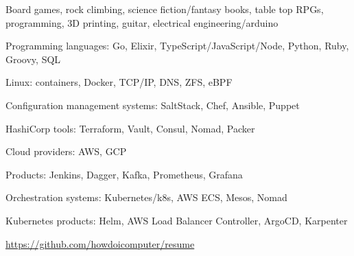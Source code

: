 \begin{cventries}
  \cventry
    {}
    {}
    {}
    {}
    {
      \begin{cvitems}
        \item {Board games, rock climbing, science fiction/fantasy books, table top RPGs, programming, 3D printing, guitar, electrical engineering/arduino}
      \end{cvitems}
    }
\end{cventries}

\begin{cventries}
  \cventry
    {}
    {}
    {}
    {}
    {
      \begin{cvitems}
        \item {Programming languages: Go, Elixir, TypeScript/JavaScript/Node, Python, Ruby, Groovy, SQL}
        \item {Linux: containers, Docker, TCP/IP, DNS, ZFS, eBPF}
        \item {Configuration management systems: SaltStack, Chef, Ansible, Puppet}
        \item {HashiCorp tools: Terraform, Vault, Consul, Nomad, Packer}
        \item {Cloud providers: AWS, GCP}
        \item {Products: Jenkins, Dagger, Kafka, Prometheus, Grafana}
        \item {Orchestration systems: Kubernetes/k8s, AWS ECS, Mesos, Nomad}
        \item {Kubernetes products: Helm, AWS Load Balancer Controller, ArgoCD, Karpenter}
      \end{cvitems}
    }
\end{cventries}

\begin{cventries}
  \cventry
    {}
    {}
    {}
    {}
    {
      \begin{cvitems}
        \item \href{https://github.com/howdoicomputer/resume}{https://github.com/howdoicomputer/resume}
      \end{cvitems}
    }
\end{cventries}
